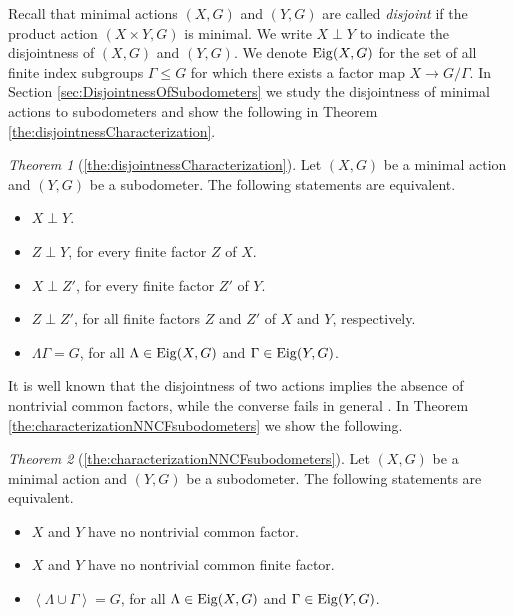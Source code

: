 \documentclass[12pt, reqno]{amsart}
\theoremstyle{definition}
\theoremstyle{remark}
\numberwithin{equation}{section}
\theoremstyle{theorem}
\newtheorem*{theorem*}{Theorem}
\theoremstyle{remark}
\newcommand{\grouphull}[1]{\left\langle #1 \right\rangle}
\def\Eig{{\rm Eig}}
\begin{document}
Recall that minimal actions $(X,G)$ and $(Y,G)$ are called \emph{disjoint} if the product action $(X\times Y,G)$ is minimal. We write $X\perp Y$ to indicate the disjointness of $(X,G)$ and $(Y,G)$. 
We denote $\Eig(X,G)$ for the set of all finite index subgroups $\Gamma\leq G$ for which there exists a factor map $X\to G/\Gamma$. 
In Section \ref{sec:DisjointnessOfSubodometers} we study the disjointness of minimal actions to subodometers and show the following in Theorem \ref{the:disjointnessCharacterization}. 

\begin{theorem*}[\ref{the:disjointnessCharacterization}]
    Let $(X,G)$ be a minimal action and $(Y,G)$ be a subodometer. 
    The following statements are equivalent. 
    \begin{itemize}
        \item[(i)] 
        $X\perp Y$.
        \item[(ii)] 
        $Z\perp Y$, for every finite factor $Z$ of $X$. 
        \item[(iii)]
        $X \perp Z'$, for every finite factor $Z'$ of $Y$.
        \item[(iv)]
        $Z \perp Z'$, for all finite factors $Z$ and $Z'$ of $X$ and $Y$, respectively.
        \item[(v)]
        $\Lambda\Gamma=G$, for all $\Lambda\in \Eig(X,G)$ and $\Gamma\in \Eig(Y,G)$.
    \end{itemize}
\end{theorem*}

It is well known that the disjointness of two actions implies the absence of nontrivial common factors, while the converse fails in general \cite[Chapter~11]{auslander1988minimal}. 
In Theorem \ref{the:characterizationNNCFsubodometers} we show the following. 

\begin{theorem*}[\ref{the:characterizationNNCFsubodometers}]
    Let $(X,G)$ be a minimal action and $(Y,G)$ be a subodometer. 
    The following statements are equivalent. 
    \begin{itemize}
        \item[(i)] $X$ and $Y$ have no nontrivial common factor.
        \item[(ii)] $X$ and $Y$ have no nontrivial common finite factor.
        \item[(iii)] $\grouphull{\Lambda\cup\Gamma}=G$, for all $\Lambda\in \Eig(X,G)$ and $\Gamma\in \Eig(Y,G)$.
    \end{itemize}    
\end{theorem*}
\end{document}
